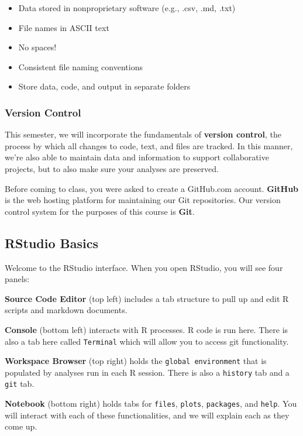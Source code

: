 \documentclass[
]{article}
\providecommand{\tightlist}{%
  \setlength{\itemsep}{0pt}\setlength{\parskip}{0pt}}
\begin{document}
\begin{itemize}
\tightlist
\item
  Data stored in nonproprietary software (e.g., .csv, .md, .txt)
\item
  File names in ASCII text
\item
  No spaces!
\item
  Consistent file naming conventions
\item
  Store data, code, and output in separate folders
\end{itemize}

\hypertarget{version-control}{%
\subsubsection{Version Control}\label{version-control}}

This semester, we will incorporate the fundamentals of \textbf{version
control}, the process by which all changes to code, text, and files are
tracked. In this manner, we're also able to maintain data and
information to support collaborative projects, but to also make sure
your analyses are preserved.

Before coming to class, you were asked to create a GitHub.com account.
\textbf{GitHub} is the web hosting platform for maintaining our Git
repositories. Our version control system for the purposes of this course
is \textbf{Git}.

\hypertarget{rstudio-basics}{%
\subsection{RStudio Basics}\label{rstudio-basics}}

Welcome to the RStudio interface. When you open RStudio, you will see
four panels:

\textbf{Source Code Editor} (top left) includes a tab structure to pull
up and edit R scripts and markdown documents.

\textbf{Console} (bottom left) interacts with R processes. R code is run
here. There is also a tab here called \texttt{Terminal} which will allow
you to access git functionality.

\textbf{Workspace Browser} (top right) holds the
\texttt{global\ environment} that is populated by analyses run in each R
session. There is also a \texttt{history} tab and a \texttt{git} tab.

\textbf{Notebook} (bottom right) holds tabs for \texttt{files},
\texttt{plots}, \texttt{packages}, and \texttt{help}. You will interact
with each of these functionalities, and we will explain each as they
come up.
\end{document}
